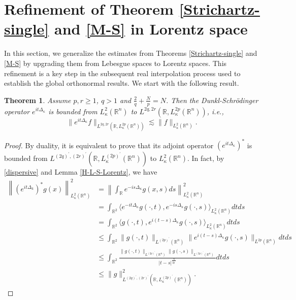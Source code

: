 \documentclass[a4paper,11pt, reqno]{amsart}
\numberwithin{equation}{section}
\theoremstyle{plain}
\newtheorem{theorem}{Theorem}[section]
\theoremstyle{definition}
\theoremstyle{remark}
\begin{document}
\section{Refinement of Theorem  \ref{Strichartz-single} and \ref{M-S} in Lorentz space}\label{sec4}
In this section, we generalize the estimates from Theorems \ref{Strichartz-single} and \ref{M-S} by upgrading them from Lebesgue spaces to Lorentz spaces. This refinement is a key step in the subsequent real interpolation process used to establish the global orthonormal results. We start with the following result. 
 \begin{theorem}
Assume $p,r\geq1$, $q>1$ and $\frac{2}{q}+\frac{N}{p}=N$. Then the Dunkl-Schr\"{o}dinger operator $e^{it\Delta_\kappa}$ is bounded from $L_\kappa^2(\mathbb{R}^n)$ to $L^{2q,2r}(\mathbb{R}, L_\kappa^{2p}(\mathbb{R}^n))$, i.e.,
\begin{equation*}
\|e^{it\Delta_\kappa}f\|_{L^{2q,2r}(\mathbb{R},L_\kappa^{2p}(\mathbb{R}^n))}\lesssim \|f\|_{L_\kappa^2(\mathbb{R}^n)}.
\end{equation*}    
\end{theorem}
\begin{proof}
    By duality, it is equivalent to prove that its adjoint operator $\left(e^{it\Delta_\kappa}\right)^*$ is bounded from $L^{(2q)^\prime,(2r)^\prime}(\mathbb{R}, L_\kappa^{(2p)^\prime}(\mathbb{R}^n))$ to $L_\kappa^2(\mathbb{R}^n)$. In fact, by \eqref{dispersive} and Lemma \ref{H-L-S-Lorentz}, we have
    \begin{align*}
       \left \|\left(e^{it\Delta_k}\right)^*g(x)\right\|^2_{L_\kappa^2(\mathbb{R}^n)}&=  \left \|\int_{\mathbb{R}}e^{-is\Delta_\kappa} g(x,s)ds\right\|^2_{L_\kappa^2(\mathbb{R}^n)}\\&=\int_{\mathbb{R}^2}\langle e^{-it\Delta_\kappa} g(\cdot,t),e^{-is\Delta_\kappa} g(\cdot,s)\rangle_{L_\kappa^2(\mathbb{R}^n)}dtds\\
        &=\int_{\mathbb{R}^2} \langle g(\cdot,t),e^{i(t-s)\Delta_\kappa} g(\cdot,s)\rangle_{L_\kappa^2(\mathbb{R}^n)}dtds\\
        &\leq \int_{\mathbb{R}^2} \|g(\cdot,t)\|_{L^{(2p)^\prime}(\mathbb{R}^n)}\|e^{i(t-s)\Delta_\kappa} g(\cdot,s)\|_{L^{2p}(\mathbb{R}^n)}dtds\\
        &\leq \int_{\mathbb{R}^2}\frac{\|g(\cdot,t)\|_{L^{(2p)^\prime}(\mathbb{R}^n)}\|g(\cdot,s)\|_{L^{(2p)^\prime}(\mathbb{R}^n)}}{|t-s|^\frac{N}{2p^\prime}} dtds\\
        &\leq \|g\|^2_{L^{(2q)^\prime,(2r)^\prime}(\mathbb{R}, L_\kappa^{(2p)^\prime}(\mathbb{R}^n))}.
    \end{align*} 
\end{proof}
\end{document}
